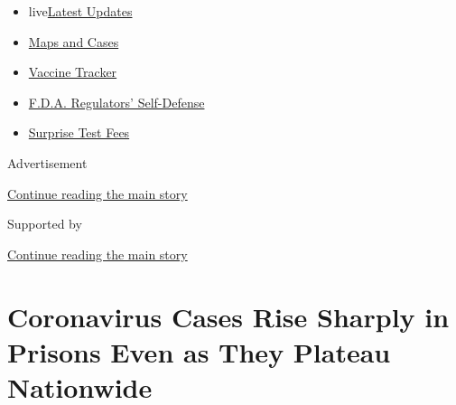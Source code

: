 \begin{itemize}
\tightlist
\item
  live\href{https://www.nytimes3xbfgragh.onion/2020/09/11/world/covid-19-coronavirus.html?name=styln-coronavirus-national\&region=TOP_BANNER\&block=storyline_menu_recirc\&action=click\&pgtype=Article\&impression_id=088aa5e0-f4ba-11ea-8fe6-a15add8e2357\&variant=undefined}{Latest
  Updates}
\item
  \href{https://www.nytimes3xbfgragh.onion/interactive/2020/us/coronavirus-us-cases.html?name=styln-coronavirus-national\&region=TOP_BANNER\&block=storyline_menu_recirc\&action=click\&pgtype=Article\&impression_id=088aa5e1-f4ba-11ea-8fe6-a15add8e2357\&variant=undefined}{Maps
  and Cases}
\item
  \href{https://www.nytimes3xbfgragh.onion/interactive/2020/science/coronavirus-vaccine-tracker.html?name=styln-coronavirus-national\&region=TOP_BANNER\&block=storyline_menu_recirc\&action=click\&pgtype=Article\&impression_id=088aa5e2-f4ba-11ea-8fe6-a15add8e2357\&variant=undefined}{Vaccine
  Tracker}
\item
  \href{https://www.nytimes3xbfgragh.onion/2020/09/10/us/politics/fda-coronavirus-vaccine.html?name=styln-coronavirus-national\&region=TOP_BANNER\&block=storyline_menu_recirc\&action=click\&pgtype=Article\&impression_id=088aa5e3-f4ba-11ea-8fe6-a15add8e2357\&variant=undefined}{F.D.A.
  Regulators' Self-Defense}
\item
  \href{https://www.nytimes3xbfgragh.onion/2020/09/09/upshot/coronavirus-surprise-test-fees.html?name=styln-coronavirus-national\&region=TOP_BANNER\&block=storyline_menu_recirc\&action=click\&pgtype=Article\&impression_id=088accf0-f4ba-11ea-8fe6-a15add8e2357\&variant=undefined}{Surprise
  Test Fees}
\end{itemize}

Advertisement

\protect\hyperlink{after-top}{Continue reading the main story}

Supported by

\protect\hyperlink{after-sponsor}{Continue reading the main story}

\hypertarget{coronavirus-cases-rise-sharply-in-prisons-even-as-they-plateau-nationwide}{%
\section{Coronavirus Cases Rise Sharply in Prisons Even as They Plateau
Nationwide}\label{coronavirus-cases-rise-sharply-in-prisons-even-as-they-plateau-nationwide}}

